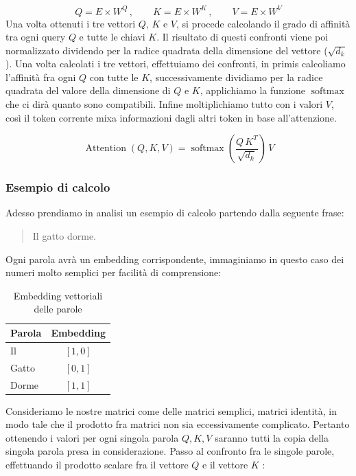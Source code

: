 \begin{equation}
    Q = E \times W^Q\,,\qquad K=E\times W^K\,,\qquad V=E\times W^V
\end{equation}
Una volta ottenuti i tre vettori 
$Q$, $K$ e $V$, si procede calcolando il grado di affinità tra ogni query $Q$ e tutte le chiavi $K$. Il risultato di questi confronti viene poi normalizzato dividendo per la radice quadrata della dimensione del vettore ($\sqrt{d_k}$). Una volta calcolati i tre vettori, effettuiamo dei confronti, in primis calcoliamo l'affinità fra ogni $Q$ con tutte le $K$, successivamente dividiamo per la radice quadrata del valore della dimensione di $Q$ e $K$, applichiamo la funzione $\operatorname{softmax}$ che ci dirà quanto sono compatibili. Infine moltiplichiamo tutto con i valori $V$, così il token corrente mixa informazioni dagli altri token in base all'attenzione.

\begin{equation}
    \operatorname{Attention}(Q,K,V) = \operatorname{softmax}\left(\frac{Q\,K^T}{\sqrt{d_k}}\right)\,V 
\end{equation}

\subsubsection{Esempio di calcolo}
Adesso prendiamo in analisi un esempio di calcolo partendo dalla seguente frase:
\begin{quote}
    Il gatto dorme.
\end{quote}

Ogni parola avrà un embedding corrispondente, immaginiamo in questo caso dei numeri molto semplici per facilità di comprensione:

\begin{table}[h!]
    \centering
    \caption{Embedding vettoriali delle parole}
    \begin{tabular}{@{}lc@{}}
        \toprule
        \textbf{Parola} & \textbf{Embedding} \\
        \midrule
        Il     & $\left[1, 0\right]$ \\
        Gatto  & $\left[0, 1\right]$ \\
        Dorme  & $\left[1, 1\right]$ \\
        \bottomrule
    \end{tabular}
\end{table}

Consideriamo le nostre matrici come delle matrici semplici, matrici identità, in modo tale che il prodotto fra matrici non sia eccessivamente complicato. Pertanto ottenendo i valori per ogni singola parola $Q,K,V$ saranno tutti la copia della singola parola presa in considerazione. Passo al confronto fra le singole parole, effettuando il prodotto scalare fra il vettore $Q$ e il vettore $K$ :


